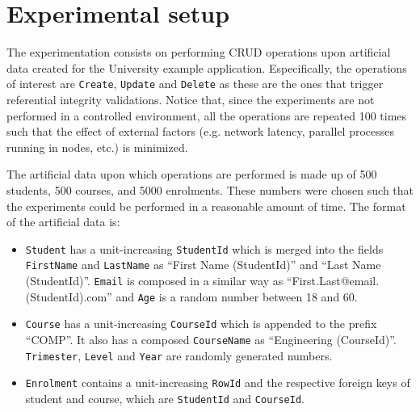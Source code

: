 \section{Experimental setup}\label{sexp:ExperimentalSetup}



The experimentation consists on performing \ac{CRUD} operations upon artificial
data created for the University example application. Especifically, the
operations of interest are \texttt{Create}, \texttt{Update} and \texttt{Delete}
as these are the ones that trigger referential integrity validations. Notice
that, since the experiments are not performed in a controlled environment, all
the operations are repeated 100 times such that the effect of external factors
(e.g. network latency, parallel processes running in nodes, etc.)  is minimized.

 
 The artificial data upon which operations are performed  is made up of 500
 students, 500 courses, and 5000 enrolments. These numbers were chosen such that
 the experiments could be performed in a reasonable amount of time. 
 The format of the artificial data is:

	\begin{itemize}
		  \item \texttt{Student} has a
		unit-increasing \texttt{StudentId}  which is merged into the fields \texttt{FirstName}
		 and \texttt{LastName} as ``First Name (StudentId)'' and ``Last Name
		(StudentId)''.  \texttt{Email} is composed in a similar way as
		``First.Last@email.(StudentId).com'' and \texttt{Age} is a random number
		between 18 and 60.
		
		\item  \texttt{Course} has a unit-increasing \texttt{CourseId} which is
		appended to the prefix ``COMP''.  It also has a composed \texttt{CourseName}
		as ``Engineering (CourseId)''.  \texttt{Trimester}, \texttt{Level}
		and \texttt{Year} are randomly generated numbers.
		
		\item  \texttt{Enrolment} contains a unit-increasing \texttt{RowId}  and the
		respective foreign keys of student and course,  which are \texttt{StudentId}
		and \texttt{CourseId}. 
	\end{itemize}
 
